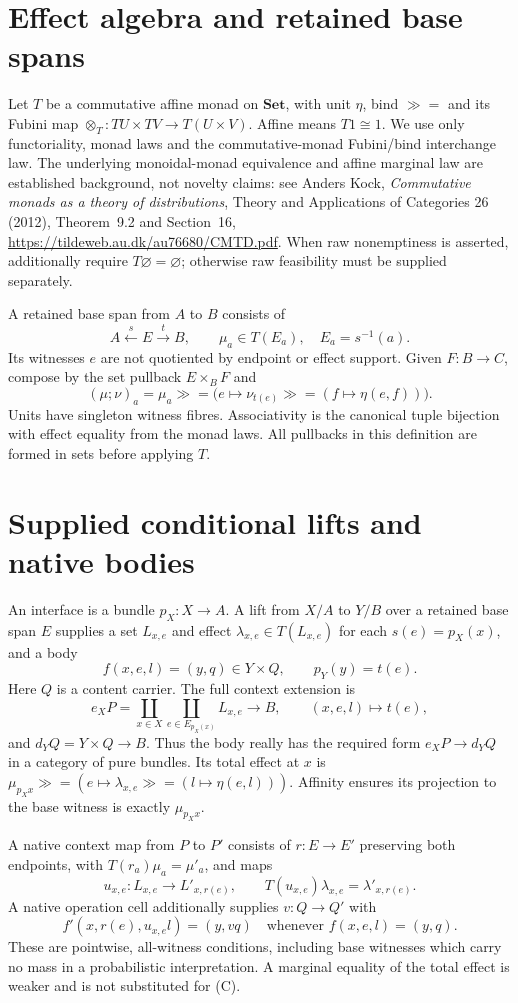 \documentclass[11pt]{article}
\begin{document}
\section{Effect algebra and retained base spans}
Let $T$ be a commutative affine monad on $\mathbf{Set}$, with unit $\eta$, bind $\mathbin{\gg=}$ and its Fubini map $\otimes_T:T U\times T V\to T(U\times V)$. Affine means $T1\cong1$. We use only functoriality, monad laws and the commutative-monad Fubini/bind interchange law. The underlying monoidal-monad equivalence and affine marginal law are established background, not novelty claims: see Anders Kock, \emph{Commutative monads as a theory of distributions}, Theory and Applications of Categories 26 (2012), Theorem~9.2 and Section~16, \url{https://tildeweb.au.dk/au76680/CMTD.pdf}. When raw nonemptiness is asserted, additionally require $T\varnothing=\varnothing$; otherwise raw feasibility must be supplied separately.

A retained base span from $A$ to $B$ consists of
\[
 A\xleftarrow{s}E\xrightarrow{t}B,\qquad
 \mu_a\in T(E_a),\quad E_a=s^{-1}(a).
\]
Its witnesses $e$ are not quotiented by endpoint or effect support. Given $F:B\to C$, compose by the set pullback $E\times_B F$ and
\[
 (\mu;\nu)_a=\mu_a\mathbin{\gg=}\bigl(e\mapsto
 \nu_{t(e)}\mathbin{\gg=} (f\mapsto\eta(e,f))\bigr).
\]
Units have singleton witness fibres. Associativity is the canonical tuple bijection with effect equality from the monad laws. All pullbacks in this definition are formed in sets before applying $T$.

\section{Supplied conditional lifts and native bodies}
An interface is a bundle $p_X:X\to A$. A lift from $X/A$ to $Y/B$ over a retained base span $E$ supplies a set $L_{x,e}$ and effect $\lambda_{x,e}\in T(L_{x,e})$ for each $s(e)=p_X(x)$, and a body
\[
 f(x,e,l)=(y,q)\in Y\times Q,
 \qquad p_Y(y)=t(e).
\]
Here $Q$ is a content carrier. The full context extension is
\[
 e_X P=\coprod_{x\in X}\coprod_{e\in E_{p_X(x)}}L_{x,e}
 \longrightarrow B,
 \qquad (x,e,l)\longmapsto t(e),
\]
and $d_Y Q=Y\times Q\to B$. Thus the body really has the required form $e_XP\to d_YQ$ in a category of pure bundles. Its total effect at $x$ is $\mu_{p_Xx}\gg=(e\mapsto\lambda_{x,e}\gg=(l\mapsto\eta(e,l)))$. Affinity ensures its projection to the base witness is exactly $\mu_{p_Xx}$.

A native context map from $P$ to $P'$ consists of $r:E\to E'$ preserving both endpoints, with $T(r_a)\mu_a=\mu'_a$, and maps
\[
 u_{x,e}:L_{x,e}\to L'_{x,r(e)},\qquad
 T(u_{x,e})\lambda_{x,e}=\lambda'_{x,r(e)}.
\tag{C}
\]
A native operation cell additionally supplies $v:Q\to Q'$ with
\[
 f'(x,r(e),u_{x,e}l)=(y,vq)\quad\text{whenever }f(x,e,l)=(y,q).
\tag{B}
\]
These are pointwise, all-witness conditions, including base witnesses which carry no mass in a probabilistic interpretation. A marginal equality of the total effect is weaker and is not substituted for (C).
\end{document}
